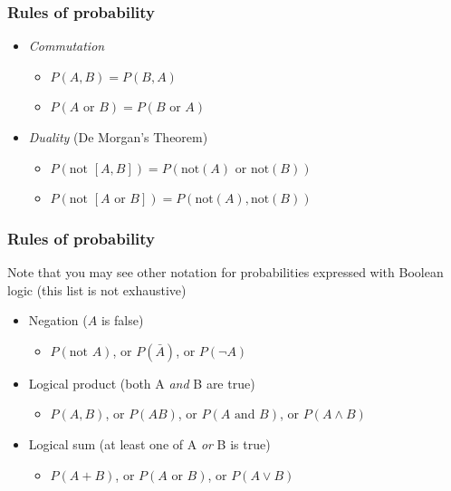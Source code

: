 \begin{frame}

\frametitle{Rules of probability}
\label{rulesofprobability}

\begin{itemize}
\item \emph{Commutation}

\begin{itemize}
\item $P(A,B) = P(B,A)$

\item $P(A \text{ or } B) = P(B \text{ or } A)$

\end{itemize}

\item \emph{Duality} (De Morgan's Theorem)

\begin{itemize}
\item $P(\text{not }[A,B]) = P(\text{not}(A) \text{ or } \text{not}(B))$

\item $P(\text{not }[A\text{ or }B]) = P(\text{not}(A),\text{not}(B))$

\end{itemize}

\end{itemize}

\end{frame}

\begin{frame}

\frametitle{Rules of probability}
\label{rulesofprobability}

Note that you may see other notation for probabilities expressed with Boolean logic (this list is
not exhaustive)

\begin{itemize}
\item Negation ($A$ is false)

\begin{itemize}
\item $P(\text{not }A)$, or $P(\bar{A})$, or $P(\lnot A)$

\end{itemize}

\item Logical product (both A \emph{and} B are true)

\begin{itemize}
\item $P(A,B)$, or $P(AB)$, or $P(A\text{ and }B)$, or $P(A\land B)$

\end{itemize}

\item Logical sum (at least one of A \emph{or} B is true)

\begin{itemize}
\item $P(A+B)$, or $P(A\text{ or }B)$, or $P(A\lor B)$

\end{itemize}

\end{itemize}

\end{frame}

